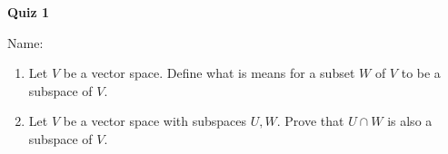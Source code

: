 \documentclass{article}
\begin{document}
\begin{center}
    {\bf Quiz 1}
\end{center}
Name:


\begin{enumerate}
    \item
        Let $V$ be a vector space. Define what is means for a subset $W$ of $V$
        to be a subspace of $V$.
        \vfill
    \item
        Let $V$ be a vector space with subspaces $U, W$. Prove that $U\cap W$
        is also a subspace of $V$.
        \vfill
\end{enumerate}
    
\end{document}
